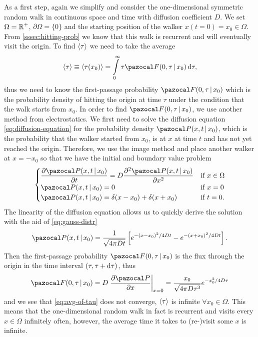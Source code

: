 As a first step, again we simplify and consider the one-dimensional symmetric random walk in continuous space and time with diffusion coefficient $D$. We set $\Omega = \operatorname{\mathbb{R}}^+$, $\partial\Omega=\{0\}$ and the starting position of the walker $x(t=0)=x_0 \in \Omega$. From \autoref{sssec:hitting-prob} we know that this walk is recurrent and will eventually visit the origin. To find $\left<\tau\right>$ we need to take the average
\begin{equation}\label{eq:avg-of-tau}
 \mfpt \equiv \avg{\tau(x_0)} = \int\limits_0^\infty \tau \F(0, \tau \,|\, x_0) \diff \tau,
\end{equation}
thus we need to know the first-passage probability $\F(0, \tau \,|\, x_0)$ which is the probability density of hitting the origin at time $\tau$ under the condition that the walk starts from $x_0$. In order to find $\F(0, \tau \,|\, x_0)$, we use another method from electrostatics. We first need to solve the diffusion equation \ref{eq:diffusion-equation} for the probability density $\P(x,t \,|\, x_0)$, which is the probability that the walker started from $x_0$, is at $x$ at time $t$ and has not yet reached the origin. Therefore, we use the image method and place another walker at $x=-x_0$ so that we have the initial and boundary value problem
\begin{equation*}
 \begin{cases}
  \dfrac{\partial \P(x, t \,|\, x_0)}{\partial t} = D \dfrac{\partial^2 \P(x, t \,|\, x_0)}{\partial x^2} & \textrm{if } x \in \Omega \\
  \P(x,t \,|\, x_0) = 0 & \textrm{if } x = 0 \\
  \P(x,t \,|\, x_0) = \delta(x-x_0) + \delta(x+x_0) & \textrm{if } t = 0.
 \end{cases}
\end{equation*}
The linearity of the diffusion equation allows us to quickly derive the solution with the aid of \autoref{eq:gauss-distr}
\begin{equation*}
 \P(x,t \,|\, x_0) = \frac{1}{\sqrt{4 \pi D t}}\left[e^{-(x-x_0)^2 / 4 Dt} - e^{-(x+x_0)^2 / 4 Dt}\right].
\end{equation*}
Then the first-passage probability $\F(0, \tau \,|\, x_0)$ is the flux through the origin in the time interval $(\tau, \tau+\mathop{}\!\mathrm{d} \tau)$, thus
\begin{equation*}
 \F(0, \tau \,|\, x_0) = D \left. \dfrac{\partial \P}{\partial x} \right|_{x=0} = \dfrac{x_0}{\sqrt{4 \pi D \tau^3}} e^{-x_0^2 / 4 D \tau}
\end{equation*}
and we see that \autoref{eq:avg-of-tau} does not converge, \ie $\left<\tau\right>$ is infinite $\forall x_0 \in \Omega$. This means that the one-dimensional random walk in fact is recurrent and visits every $x \in \Omega$ infinitely often, however, the average time it takes to (re-)visit some $x$ is infinite.

